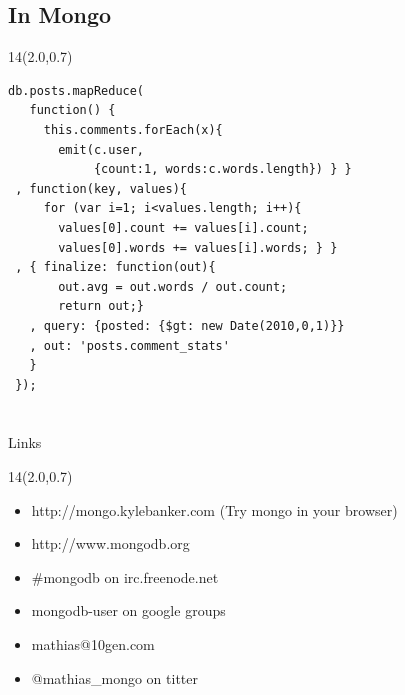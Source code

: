 \documentclass{beamer}
\newcommand{\MongoLogo}{
\begin{textblock}{14}(2.0,0.7)
  \pgfuseimage{logo}
\end{textblock}
}
\begin{document}
\subsection{In Mongo}
\begin{frame} [fragile]
  \MongoLogo

  \begin{small}
  \begin{verbatim}
db.posts.mapReduce(
   function() {
     this.comments.forEach(x){
       emit(c.user, 
            {count:1, words:c.words.length}) } }
 , function(key, values){
     for (var i=1; i<values.length; i++){
       values[0].count += values[i].count;
       values[0].words += values[i].words; } }
 , { finalize: function(out){ 
       out.avg = out.words / out.count;
       return out;}
   , query: {posted: {$gt: new Date(2010,0,1)}}
   , out: 'posts.comment_stats'
   }
 });
  \end{verbatim}
  \end{small}
\end{frame}

\section{}
\begin{frame}{Links}
  \MongoLogo
  \begin{itemize}
    \item http://mongo.kylebanker.com (Try mongo in your browser)
    \item http://www.mongodb.org
    \item \#mongodb on irc.freenode.net
    \item mongodb-user on google groups
  \end{itemize}
  \begin{itemize}
    \item mathias@10gen.com
    \item @mathias\_mongo on titter
  \end{itemize}
\end{frame}
\end{document}
